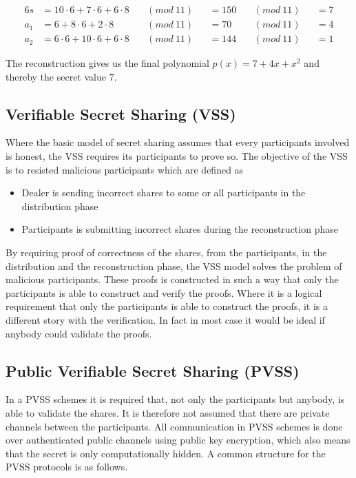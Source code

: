 \noindent
\begin{alignat*}{6}
s&  = 10 \cdot 6 + 7 \cdot 6 + 6 \cdot 8 \ &&(mod \ 11)  &&= 150  \ &&(mod \ 11) &&= 7\\
a_1&= 6 + 8 \cdot 6 + 2 \cdot 8 \ &&(mod \ 11) &&= 70  \ &&(mod \ 11) &&= 4\\
a_2&= 6 \cdot 6 +10 \cdot 6+ 6 \cdot 8 \ &&(mod \ 11) &&= 144  \ &&(mod \ 11) &&= 1
\end{alignat*}

\noindent
The reconstruction gives us the final polynomial $p(x)=7 + 4x+ x^2$ and thereby the secret value $7$.


\subsection{Verifiable Secret Sharing (VSS)}
Where the basic model of secret sharing assumes that every participants involved is honest, the VSS requires its participants to prove so. The objective of the VSS is to resisted malicious participants which are defined as \cite{Schoenmakers1999}

\begin{itemize}
    \item Dealer is sending incorrect shares to some or all participants in the distribution phase
    \item Participants is submitting incorrect shares during the reconstruction phase
\end{itemize}

\noindent 
By requiring proof of correctness of the shares, from the participants, in the distribution and the reconstruction phase, the VSS model solves the problem of malicious participants. These proofs is constructed in such a way that only the participants is able to construct and verify the proofs. Where it is a logical requirement that only the participants is able to construct the proofs, it is a different story with the verification. In fact in most case it would be ideal if anybody could validate the proofs. 


\subsection{Public Verifiable Secret Sharing (PVSS)}
In a PVSS schemes it is required that, not only the participants but anybody, is able to validate the shares. It is therefore not assumed that there are private channels between the participants. All communication in PVSS schemes  is done over authenticated public channels using public key encryption, which also means that the secret is only computationally hidden. A common structure for the PVSS protocols is as follows.

